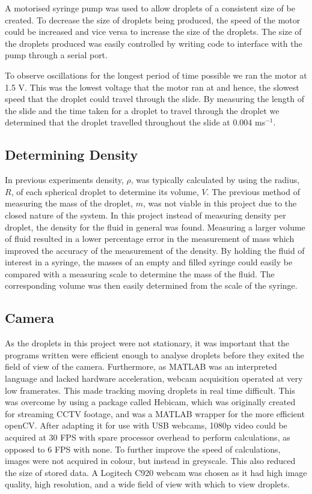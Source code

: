 \documentclass{physics_article_B}
\begin{document}
        A motorised syringe pump was used to allow droplets of a consistent size of be created. To decrease the size of droplets being produced, the speed of the motor could be increased and vice versa to increase the size of the droplets. The size of the droplets produced was easily controlled by writing code to interface with the pump through a serial port. 
        
        To observe oscillations for the longest period of time possible we ran the motor at 1.5 V. This was the lowest voltage that the motor ran at and hence, the slowest speed that the droplet could travel through the slide. By measuring the length of the slide and the time taken for a droplet to travel through the droplet we determined that the droplet travelled throughout the slide at 0.004 ms$^{-1}$.  
        
    \subsection{Determining Density\label{sect:method:density}}
    
        In previous experiments density, $\rho$, was typically calculated by using the radius, $R$, of each spherical droplet to determine its volume, $V$. The previous method of measuring the mass of the droplet, $m$, was not viable in this project due to the closed nature of the system. In this project instead of measuring density per droplet, the density for the fluid in general was found. Measuring a larger volume of fluid resulted in a lower percentage error in the measurement of mass which improved the accuracy of the measurement of the density. By holding the fluid of interest in a syringe, the masses of an empty and filled syringe could easily be compared with a measuring scale to determine the mass of the fluid. The corresponding volume was then easily determined from the scale of the syringe. 
        
    \subsection{Camera\label{sect:method:vision}}
        
        As the droplets in this project were not stationary, it was important that the programs written were efficient enough to analyse droplets before they exited the field of view of the camera. Furthermore, as MATLAB was an interpreted language and lacked hardware acceleration, webcam acquisition operated at very low framerates. This made tracking moving droplets in real time difficult. This was overcome by using a package called Hebicam\cite{HebiCam}, which was originally created for streaming CCTV footage, and was a MATLAB wrapper for the more efficient openCV. After adapting it for use with USB webcams, 1080p video could be acquired at 30 FPS with spare processor overhead to perform calculations, as opposed to 6 FPS with none. To further improve the speed of calculations, images were not acquired in colour, but instead in greyscale. This also reduced the size of stored data. A Logitech C920 webcam was chosen as it had high image quality, high resolution, and a wide field of view with which to view droplets. 
            
\end{document}
